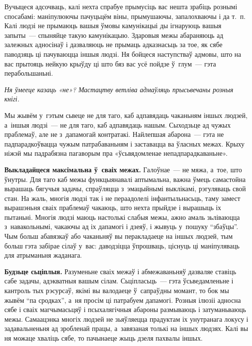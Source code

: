 Вучыцеся адсочваць, калі нехта спрабуе прымусіць вас нешта зрабіць рознымі спосабамі: маніпулюючы пачуцьцём віны, прымушаючы, запалохваючы і да т.~п. Калі людзі не прымаюць вашыя ўмовы камунікацыі ды ігнаруюць вашыя запыты~--- спыняйце такую камунікацыю. Здаровыя межы абараняюць ад залежных адносінаў і дазваляюць не прымаць адказнасьць за тое, як сябе паводзяць ці пачуваюцца іншыя людзі. Ня бойцеся наступстваў адмовы, што на вас прытояць нейкую крыўду ці што бяз вас усё пойдзе ў~глум~--- гэта перабольшаньні.

\emph{Ня ўмееце казаць «не»? Мастацтву ветліва адмаўляць прысьвечаны розныя кнігі.}

Мы жывём у~гэтым сьвеце не для таго, каб адпавядаць чаканьням іншых людзей, а~іншыя людзі~--- не для таго, каб адпавядаць нашым. Сыходзьце ад чужых праблемаў, але не з~дапамогай контратакі. Найлепшая абарона~--- гэта не падпарадкоўвацца чужым патрабаваньням і заставацца ва ўласных межах. Крыху ніжэй мы падрабязна пагаворым пра «ўсьвядомленае непадпарадкаваньне».

\textbf{Выкладайцеся максімальна ў~сваіх межах.} Галоўнае~--- не мяжа, а~тое, што ўнутры. Для таго каб межы функцыянавалі аптымальна, важна ўмець самастойна вырашаць бягучыя задачы, спраўляцца з~эмацыйнымі выклікамі, рэгуляваць свой стан. На жаль, многія людзі так і не пераадолелі інфантыльнасьць, таму замест вырашэньня сваіх праблемаў чакаюць, што нехта прыйдзе і вырашыць іх пытаньні. Многія людзі маюць настолькі слабыя межы, ажно амаль зьліваюцца з~навакольнымі, чакаючы ад іх дапамогі і дзеяў, і жывуць у~пошуку ``збаўцы''. Чым больш абавязкаў або чаканьняў вы перакладаеце на іншых людзей, тым больш гэта забірае сілаў у~вас: даводзіцца ўпрошваць, ціснуць ці маніпуляваць для атрыманьня жаданага.


\textbf{Будзьце сьціплыя.} Разуменьне сваіх межаў і абмежаваньняў дазваляе ставіць сабе задачы, адэкватныя вашым сілам. Сьціпласьць~--- гэта ўсьведамленьне і кантроль тых рэсурсаў, якімі вы валодаеце ў~сапраўдны момант, то бок мы жывём ``па сродках'', а~ня просім ці патрабуем дапамогі. Розныя ілюзіі адносна сябе і сваіх магчымасьцяў і псыхалягічныя абароны размываюць і затуманьваюць межы. Самаацэнка многіх людзей не зьяўляецца прадуктам іх унутранага локусу і задавальненьня ад зробленай працы, а~завязаная толькі на іншых людзях. Калі вы ня можаце хваліць сябе, то пачынаеце жыць дзеля пахвалы іншых. 

